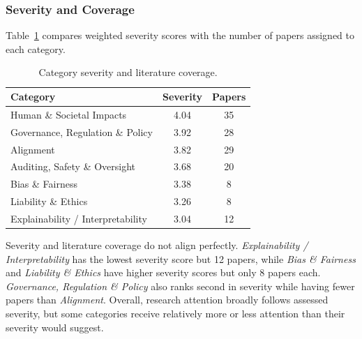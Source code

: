 \begin{toreview}
    \subsubsection{Severity and Coverage}

    Table~\ref{tab:severity_coverage} compares weighted severity scores with the number of papers assigned to each category.

    \begin{table}[h]
        \centering
        \caption{Category severity and literature coverage.}
        \label{tab:severity_coverage}
        \begin{tabular}{|l|c|c|}
            \hline
            \textbf{Category} & \textbf{Severity} & \textbf{Papers} \\
            \hline
            Human \& Societal Impacts         & 4.04 & 35 \\
            Governance, Regulation \& Policy  & 3.92 & 28 \\
            Alignment                         & 3.82 & 29 \\
            Auditing, Safety \& Oversight     & 3.68 & 20 \\
            Bias \& Fairness                  & 3.38 & 8  \\
            Liability \& Ethics               & 3.26 & 8  \\
            Explainability / Interpretability & 3.04 & 12 \\
            \hline
        \end{tabular}
    \end{table}

    Severity and literature coverage do not align perfectly. \emph{Explainability / Interpretability} has the lowest severity score but 12 papers, while \emph{Bias \& Fairness} and \emph{Liability \& Ethics} have higher severity scores but only 8 papers each. \emph{Governance, Regulation \& Policy} also ranks second in severity while having fewer papers than \emph{Alignment}. Overall, research attention broadly follows assessed severity, but some categories receive relatively more or less attention than their severity would suggest.



\end{toreview}

